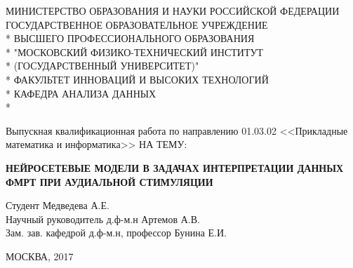 \documentclass[pdftex,ptm,12pt,a4paper]{report}
\theoremstyle{definition}
\begin{document}
\begin{titlepage}
\newpage

\begin{center}
МИНИСТЕРСТВО ОБРАЗОВАНИЯ И НАУКИ РОССИЙСКОЙ ФЕДЕРАЦИИ \\
\vspace{0.5cm}
ГОСУДАРСТВЕННОЕ ОБРАЗОВАТЕЛЬНОЕ УЧРЕЖДЕНИЕ \\*
ВЫСШЕГО ПРОФЕССИОНАЛЬНОГО ОБРАЗОВАНИЯ\\*
"МОСКОВСКИЙ ФИЗИКО-ТЕХНИЧЕСКИЙ ИНСТИТУТ \\*
(ГОСУДАРСТВЕННЫЙ УНИВЕРСИТЕТ)" \\*
\vspace{0.5cm}
ФАКУЛЬТЕТ ИННОВАЦИЙ И ВЫСОКИХ ТЕХНОЛОГИЙ \\*
КАФЕДРА АНАЛИЗА ДАННЫХ \\*
\hrulefill
\end{center}


\vspace{8em}

\begin{center}
\Large Выпускная квалификационная работа по направлению 01.03.02 <<Прикладные математика и информатика>> \linebreak НА ТЕМУ:
\end{center}

\vspace{2.5em}

\begin{center}
\textsc{\large{\textbf{НЕЙРОСЕТЕВЫЕ МОДЕЛИ В ЗАДАЧАХ ИНТЕРПРЕТАЦИИ ДАННЫХ ФМРТ ПРИ АУДИАЛЬНОЙ СТИМУЛЯЦИИ}}}
\end{center}

\vspace{6.5em}

\begin{flushleft}
Студент \hrulefill Медведева А.Е. \\
\vspace{1.5em}
Научный руководитель д.ф-м.н \hrulefill Артемов А.В.\\
\vspace{1.5em}
Зам. зав. кафедрой д.ф-м.н, профессор \hrulefill Бунина Е.И.
\end{flushleft}

\vspace{\fill}

\begin{center}
МОСКВА, 2017
\end{center}

\end{titlepage}
\end{document}
